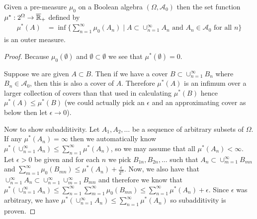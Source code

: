 \begin{lem}\label{PremeasureToOuterMeasure}Given a pre-measure $\mu_0$ on a Boolean algebra $(\Omega,
  \mathcal{A}_0)$ then the set function $\mu^* : 2^\Omega \to
  \overline{\mathbb{R}}_+$ defined by
\begin{align*}
\mu^*(A) &= \inf \lbrace \sum_{n=1}^\infty \mu_0(A_n) \mid A \subset
\cup_{n=1}^\infty A_n \text { and } A_n \in \mathcal{A}_0 \text{ for
  all $n$} \rbrace
\end{align*}
is an outer measure.
\end{lem}
\begin{proof}
Because $\mu_0(\emptyset)$ and $\emptyset \subset \emptyset$ we see
that $\mu^*(\emptyset) = 0$.

Suppose we are given $A \subset B$.  Then if we have a cover $B
\subset \cup_{n=1}^\infty B_n$ where $B_n \in \mathcal{A}_0$, then
this is also a cover of $A$.  Therefore $\mu^*(A)$ is an infimum over
a larger collection of covers than that used in calculating $\mu^*(B)$
hence $\mu^*(A) \leq \mu^*(B)$ (we could actually pick an $\epsilon$
and an approximating cover as below then let $\epsilon \to 0$).

Now to show subadditivity.  Let $A_1, A_2, \dotsc$ be a sequence of
arbitrary subsets of $\Omega$.  If any $\mu^*(A_n) = \infty$ then we
automatically know $\mu^*(\cup_{n=1}^\infty A_n) \leq \sum_{n=1}^\infty \mu^*(A_n)$, so we
may assume that all $\mu^*(A_n) < \infty$.  Let $\epsilon > 0$ be
given and for each $n$ we pick $B_{1n}, B_{2n}, \dotsc$ such that $A_n
\subset \cup_{m=1}^\infty B_{mn}$ and $\sum_{m=1}^\infty \mu_0(B_{mn})
\leq \mu^*(A_n) + \frac{\epsilon}{2^n}$.  Now, we also have that
$\cup_{n=1}^\infty A_n
\subset  \cup_{n=1}^\infty \cup_{m=1}^\infty B_{mn}$ and therefore we
know that $\mu^*(\cup_{n=1}^\infty A_n) \leq \sum_{n=1}^\infty \sum_{m=1}^\infty
\mu_0(B_{mn}) \leq \sum_{n=1}^\infty \mu^*(A_n) + \epsilon$.  Since
$\epsilon$ was arbitrary, we have $\mu^*(\cup_{n=1}^\infty A_n) \leq \sum_{n=1}^\infty
\mu^*(A_n)$ so subadditivity is proven.
\end{proof}

